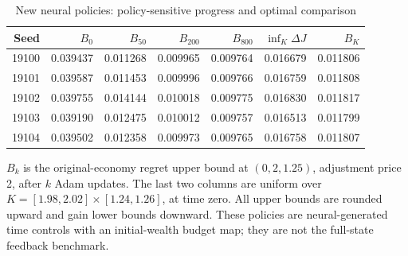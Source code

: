 \begin{table}[htbp]
\centering\small
\caption{New neural policies: policy-sensitive progress and optimal comparison}\label{tab:r19values}
\begin{tabular}{rrrrrrr}\toprule
Seed & $B_0$ & $B_{50}$ & $B_{200}$ & $B_{800}$ & $\inf_K\Delta J$ & $B_K$\\
\midrule
19100 & 0.039437 & 0.011268 & 0.009965 & 0.009764 & 0.016679 & 0.011806\\
19101 & 0.039587 & 0.011453 & 0.009996 & 0.009766 & 0.016759 & 0.011808\\
19102 & 0.039755 & 0.014144 & 0.010018 & 0.009775 & 0.016830 & 0.011817\\
19103 & 0.039190 & 0.012475 & 0.010012 & 0.009757 & 0.016513 & 0.011799\\
19104 & 0.039502 & 0.012358 & 0.009973 & 0.009765 & 0.016758 & 0.011807\\
\bottomrule
\end{tabular}
\par\smallskip\begin{minipage}{.98\textwidth}\footnotesize $B_k$ is the original-economy regret upper bound at $(0,2,1.25)$, adjustment price 2, after $k$ Adam updates. The last two columns are uniform over $K=[1.98,2.02]\times[1.24,1.26]$, at time zero. All upper bounds are rounded upward and gain lower bounds downward. These policies are neural-generated time controls with an initial-wealth budget map; they are not the full-state feedback benchmark.\end{minipage}
\end{table}
